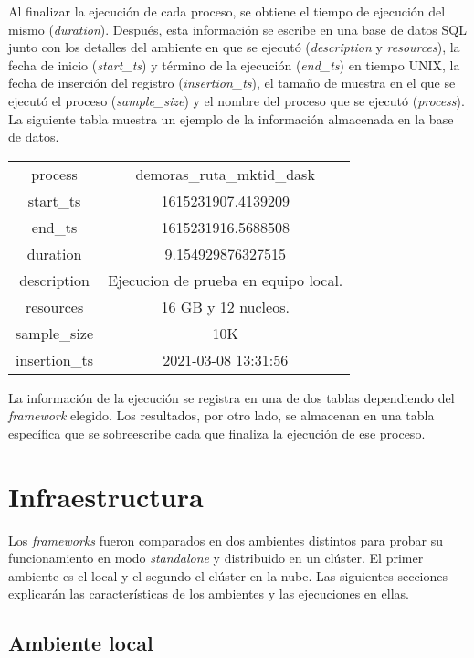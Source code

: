 Al finalizar la ejecución de cada proceso, se obtiene el tiempo de ejecución del mismo (\textit{duration}). Después, esta información se escribe en una base de datos SQL junto con los detalles del ambiente en que se ejecutó (\textit{description} y \textit{resources}), la fecha de inicio (\textit{start\_ts}) y término de la ejecución (\textit{end\_ts}) en tiempo UNIX, la fecha de inserción del registro (\textit{insertion\_ts}), el tamaño de muestra en el que se ejecutó el proceso (\textit{sample\_size}) y el nombre del proceso que se ejecutó (\textit{process}). La siguiente tabla muestra un ejemplo de la información almacenada en la base de datos.

\begin{center}
\begin{tabular}{|c|c|}
 \hline
  process & demoras\_ruta\_mktid\_dask \\ 
  start\_ts & 1615231907.4139209 \\
  end\_ts & 1615231916.5688508 \\ 
  duration & 9.154929876327515 \\ 
  description & Ejecucion de prueba en equipo local. \\
  resources & 16 GB y 12 nucleos. \\
  sample\_size & 10K \\
  insertion\_ts & 2021-03-08 13:31:56 \\
  \hline
\end{tabular}
\end{center}


La información de la ejecución se registra en una de dos tablas dependiendo del \textit{framework} elegido. Los resultados, por otro lado, se almacenan en una tabla específica que se sobreescribe cada que finaliza la ejecución de ese proceso. 

\section{Infraestructura}

Los \textit{frameworks} fueron comparados en dos ambientes distintos para probar su funcionamiento en modo \textit{standalone} y distribuido en un clúster. El primer ambiente es el local y el segundo el clúster en la nube. Las siguientes secciones explicarán las características de los ambientes y las ejecuciones en ellas.

\subsection{Ambiente local}

